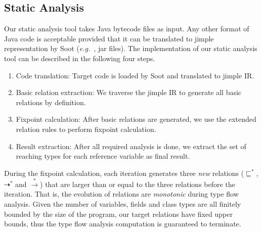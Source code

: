 \documentclass{fac}
\newcommand\eg{\textit{e.g.\ }}
\newcommand{\less}{\sqsubseteq}
\newcommand{\tflow}{\dashrightarrow}
\newcommand{\hflow}{\longrightarrow}
\newcommand{\lhflow}[1]{\stackrel{#1}{\hflow}}
\begin{document}


\subsection{Static Analysis}\label{subsec:static-analysis-tool}
Our static analysis tool %
takes Java bytecode files as input. Any other format of Java code is acceptable provided that it can be translated to jimple representation by Soot (\eg, jar files). The implementation of our static analysis tool can be described in the following four steps. %
\begin{enumerate}
\item Code translation:
Target code is loaded by Soot and translated to jimple IR. %
\item Basic relation extraction: %
We traverse the %
jimple IR to generate all basic relations by definition.
\item Fixpoint calculation:
After basic relations are generated, we use the extended relation rules to perform fixpoint calculation.
\item Result extraction:
After all required analysis is done, we extract the set of reaching types for each reference variable as final result.
\end{enumerate}

During the fixpoint calculation, each iteration generates three \emph{new} relations ($\less^*$, $\tflow^*$ and $\lhflow{*}$) that are larger than or equal to the three relations before the iteration. That is, the evolution of relations are \emph{monotonic} during type flow analysis. Given the number of variables, fields and class types are all finitely bounded by the size of the program, our target relations have fixed upper bounds, thus the type flow analysis computation is guaranteed to terminate.
\end{document}
